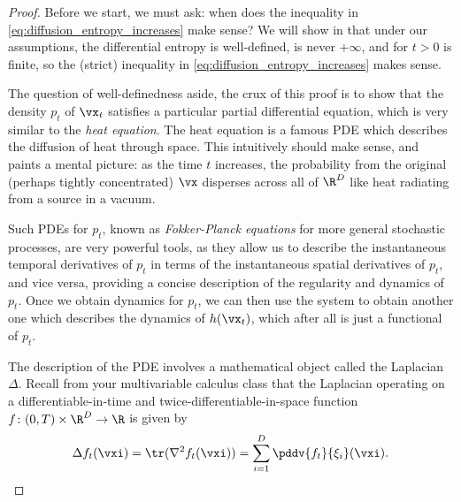 \documentclass[../../book-main.tex]{subfiles}
\begin{document}
\begin{proof}
    Before we start, we must ask: when does the inequality in
    \eqref{eq:diffusion_entropy_increases} make sense? We will show
    in  that under our
    assumptions, the differential entropy is well-defined, is never
    \(+\infty\), and for \(t > 0\) is finite, so the (strict)
    inequality in \eqref{eq:diffusion_entropy_increases} makes sense.

    The question of well-definedness aside, the crux of this proof is
    to show that the density \(p_{t}\) of \(\vx_{t}\) satisfies a
    particular partial differential equation, which is very similar
    to the \textit{heat equation}. The heat equation is a famous PDE
    which describes the diffusion of heat through space. This
    intuitively should make sense, and paints a mental picture: as
    the time \(t\) increases, the probability from the original
    (perhaps tightly concentrated) \(\vx\) disperses across all of
    \(\R^{D}\) like heat radiating from a source in a vacuum.

    Such PDEs for \(p_{t}\), known as \textit{Fokker-Planck
    equations} for more general stochastic processes, are very
    powerful tools, as they allow us to describe the instantaneous
    temporal derivatives of \(p_{t}\) in terms of the instantaneous
    spatial derivatives of \(p_{t}\), and vice versa, providing a
    concise description of the regularity and dynamics of \(p_{t}\).
    Once we obtain dynamics for \(p_{t}\), we can then use the system
    to obtain another one which describes the dynamics of
    \(h(\vx_{t})\), which after all is just a functional of \(p_{t}\).

    The description of the PDE involves a mathematical object called
    the Laplacian \(\Delta\). Recall from your multivariable calculus
    class that the Laplacian operating on a differentiable-in-time
    and twice-differentiable-in-space function \(f \colon (0, T)
    \times \R^{D} \to \R\) is given by
    \begin{equation}
        \Delta f_{t}(\vxi) = \tr(\nabla^{2}f_{t}(\vxi)) = \sum_{i =
        1}^{D}\pddv{f_{t}}{\xi_{i}}(\vxi).
    \end{equation}


\end{proof}
\end{document}
